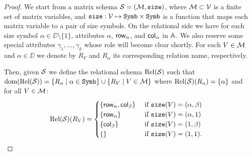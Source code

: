 \begin{proof}
We start from a matrix schema $\mathcal{S}=(\mathcal{M},\texttt{size})$, where $\mathcal{M}\subset \mathcal{V}$ is a finite set of matrix variables, 
and $\texttt{size}: \mathcal{V} \mapsto \texttt{Symb}\times \texttt{Symb}$ is a function that maps each matrix variable to a pair of size symbols. 
On the relational side we have for each size symbol $\alpha\in\DD\setminus\{1\}$, attributes $\alpha$, $\mathsf{row}_\alpha$, 
and $\mathsf{col}_\alpha$ in $\mathbb{A}$. We also reserve some special attributes $\gamma_1,\ldots,\gamma_k$ whose role will become clear shortly.
For each $V\in\mathcal{M}$ and $\alpha \in \DD$ we denote
by $R_V$ and $R_\alpha$ its corresponding relation name, respectively. 

Then, given $\mathcal{S}$ we define the relational 
schema $\text{Rel}(\mathcal{S})$ such that $\operatorname{dom}(\text{Rel}(\mathcal{S})) =  \{R_\alpha \mid \alpha\in\texttt{Symb}\} \cup \{R_V \mid V \in \mathcal{M}\}$
where $\text{Rel}(\mathcal{S})(R_\alpha) = \{\alpha\}$ and for all $V\in\mathcal{M}$:
\[
\text{Rel}(\mathcal{S})(R_V) = \begin{cases}
\lbrace\mathsf{row}_\alpha,\mathsf{col}_\beta \rbrace & \text{ if $ \texttt{size}(V)=(\alpha,\beta)$} \\
\lbrace\mathsf{row}_\alpha \rbrace & \text{ if $ \texttt{size}(V)=(\alpha,1)$} \\
\lbrace\mathsf{col}_\beta \rbrace  &
\text{ if $ \texttt{size}(V)=(1,\beta)$} \\
\lbrace\rbrace & \text{ if $\texttt{size}(V)=(1,1)$}.
\end{cases}
\]


\end{proof}
